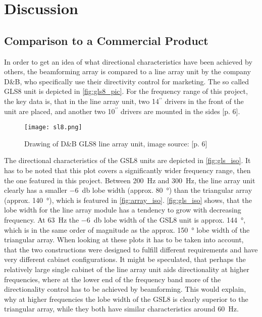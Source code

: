 \chapter{Discussion}
\section{Comparison to a Commercial Product}
In order to get an idea of what directional characteristics have been achieved by others, the beamforming array is compared to a line array unit by the company D\&B, who specifically use their directivity control for marketing. The so called GLS8 unit is depicted in \autoref{fig:gls8_pic}. For the frequency range of this project, the key data is, that in the line array unit, two 14$^{\prime \prime}$ drivers in the front of the unit are placed, and another two 10$^{\prime \prime}$ drivers are mounted in the sides \citep{SL_GSL}[p. 6]. 
\begin{figure}[h]
\centering
\texttt{[image: sl8.png]}
\caption{Drawing of D\&B GLS8 line array unit, image source: \citep{SL_GSL}[p. 6]}
\end{figure}
The directional characteristics of the GSL8 units are depicted in \autoref{fig:gls_iso}. 
It has to be noted that this plot covers a significantly wider frequency range, then the one featured in this project. Between \SI{200}{\hertz} and \SI{300}{\hertz}, the line array unit clearly has a smaller \SI{-6}{\decibel} lobe width (approx. \SI{80}{\degree}) than the triangular array (approx. \SI{140}{\degree}), which is featured in \autoref{fig:array_iso}.
\autoref{fig:gls_iso} shows, that the lobe width for the line array module has a tendency to grow with decreasing frequency. At \SI{63}{\hertz} the \SI{-6}{\decibel} lobe width of the GSL8 unit is approx. \SI{144}{\degree}, which is in the same order of magnitude as the approx. \SI{150}{\degree} lobe width of the triangular array. When looking at these plots it has to be taken into account, that the two constructions were designed to fulfill different requirements and have very different cabinet configurations. It might be speculated, that perhaps the relatively large single cabinet of the line array unit aids directionality at higher frequencies, where at the lower end of the frequency band more of the directionality control has to be achieved by beamforming. This would explain, why at higher frequencies the lobe width of the GSL8 is clearly superior to the triangular array, while they both have similar characteristics around \SI{60}{\hertz}.
